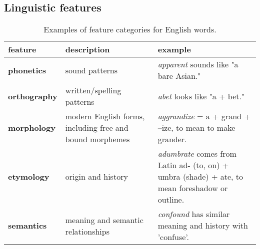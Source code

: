\subsection{Linguistic features} \label{sec:linguistic-features}

\begin{table*}[!htb]
\centering
\caption{Examples of feature categories for English words.}
\label{tab:linguistic-features}
\begin{tabularx}{\textwidth}{l >{\raggedright\arraybackslash}X >{\raggedright\arraybackslash}X}
\toprule
\textbf{feature} & \textbf{description} & \textbf{example} \\
\midrule
\textbf{phonetics} & sound patterns & \emph{apparent} sounds like "a bare Asian." \\
\addlinespace
\textbf{orthography} & written/spelling patterns & \emph{abet} looks like "a + bet." \\
\addlinespace
\textbf{morphology} & modern English forms, including free and bound morphemes & \emph{aggrandize} = a + grand + –ize, to mean to make grander. \\
\addlinespace
\textbf{etymology} & origin and history & \emph{adumbrate} comes from Latin ad- (to, on) + umbra (shade) + ate, to mean foreshadow or outline. \\
\addlinespace
\textbf{semantics} & meaning and semantic relationships & \emph{confound} has similar meaning and history with 'confuse'. \\
\bottomrule
\end{tabularx}
\end{table*}
